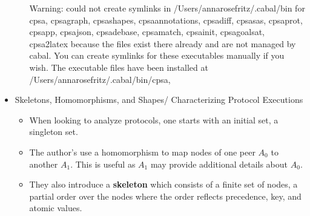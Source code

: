 \documentclass[12pt, letterpaper]{article}
\begin{document}
\begin{itemize}
\begin{itemize}
        Warning: could not create symlinks in /Users/annarosefritz/.cabal/bin for
        cpsa, cpsagraph, cpsashapes, cpsaannotations, cpsadiff, cpsasas, cpsaprot,
        cpsapp, cpsajson, cpsadebase, cpsamatch, cpsainit, cpsagoalsat, cpsa2latex
        because the files exist there already and are not managed by cabal. You can
        create symlinks for these executables manually if you wish. The executable
        files have been installed at /Users/annarosefritz/.cabal/bin/cpsa, 
    \end{itemize}
    \item Skeletons, Homomorphisms, and Shapes/ Characterizing Protocol Executions
    \begin{itemize}
        \item When looking to analyze protocols, one starts with an initial set, a singleton set. 
        \item The author's use a homomorphism to map nodes of one peer $A_0$ to another $A_1$. This is useful as $A_1$ may provide additional details about $A_0$.
        \item They also introduce a \textbf{skeleton} which consists of a finite set of nodes, a partial order over the nodes where the order reflects precedence, key, and atomic values.   
    \end{itemize}
\end{itemize}
\end{document}
